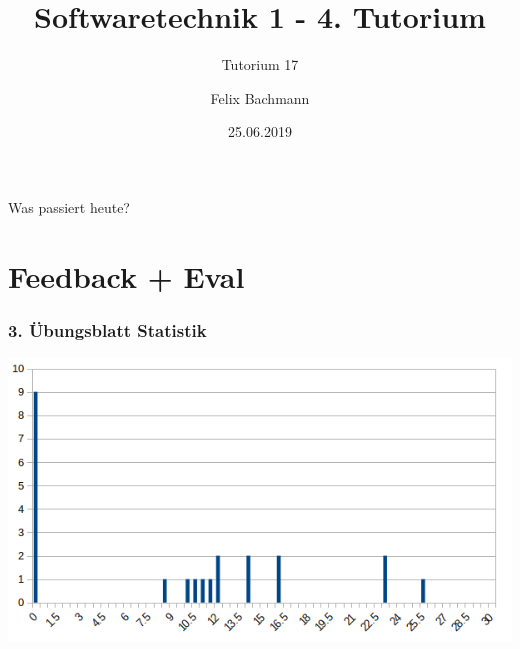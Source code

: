 \documentclass[18pt]{beamer}
\title[SWT1]{Softwaretechnik 1 - 4. Tutorium}
\subtitle{Tutorium 17}
\author{Felix Bachmann}
\date{25.06.2019}
\institute{KIT - Institut für Programmstrukturen und Datenorganisation (IPD)}
\begin{document}

\begin{frame}
\titlepage
\end{frame}

\begin{frame}{Was passiert heute?}
\tableofcontents
\end{frame}

\section{Feedback + Eval}
	\begin{frame}
	\frametitle{3. Übungsblatt Statistik}
	\includegraphics[scale=0.7]{./pics/tut3/statistics-ub3.png}
\end{frame}
\end{document}
